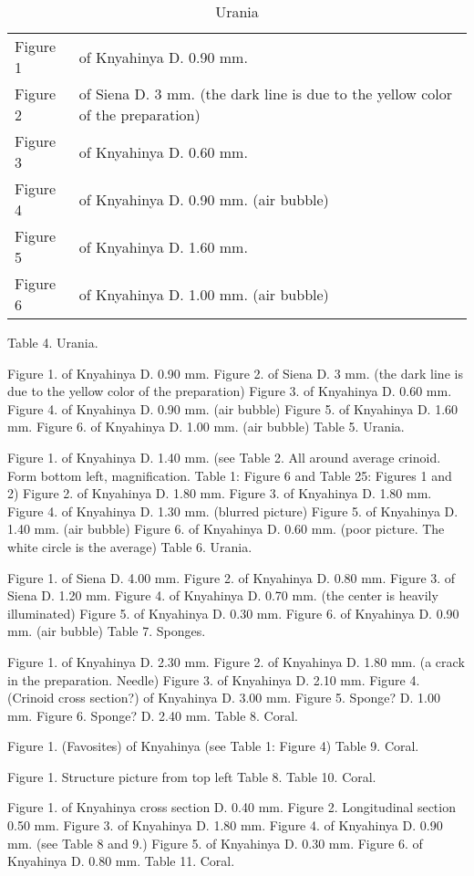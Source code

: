 \documentclass[a4paper, 11pt, oneside]{article}
\begin{document}
\begin{table}[h!]
\caption{Urania}
\centering
\begin{tabular}{ p{1.5cm} p{10cm} }
\hline
 Figure 1 & of Knyahinya D. 0.90 mm. \\
 Figure 2 & of Siena D. 3 mm. (the dark line is due to the yellow color of the preparation) \\
 Figure 3 & of Knyahinya D. 0.60 mm. \\
 Figure 4 & of Knyahinya D. 0.90 mm. (air bubble) \\
 Figure 5 & of Knyahinya D. 1.60 mm. \\
 Figure 6 & of Knyahinya D. 1.00 mm. (air bubble)
\end{tabular}
\label{table:4}
\end{table}
Table 4. Urania.

Figure 1. of Knyahinya D. 0.90 mm.
Figure 2. of Siena D. 3 mm. (the dark line is due to the yellow color of the preparation)
Figure 3. of Knyahinya D. 0.60 mm.
Figure 4. of Knyahinya D. 0.90 mm. (air bubble)
Figure 5. of Knyahinya D. 1.60 mm.
Figure 6. of Knyahinya D. 1.00 mm. (air bubble)
Table 5. Urania.

Figure 1. of Knyahinya D. 1.40 mm. (see Table 2. All around average crinoid. Form bottom left, magnification. Table 1: Figure 6 and Table 25: Figures 1 and 2)
Figure 2. of Knyahinya D. 1.80 mm.
Figure 3. of Knyahinya D. 1.80 mm.
Figure 4. of Knyahinya D. 1.30 mm. (blurred picture)
Figure 5. of Knyahinya D. 1.40 mm. (air bubble)
Figure 6. of Knyahinya D. 0.60 mm. (poor picture. The white circle is the average)
Table 6. Urania.

Figure 1. of Siena D. 4.00 mm.
Figure 2. of Knyahinya D. 0.80 mm.
Figure 3. of Siena D. 1.20 mm.
Figure 4. of Knyahinya D. 0.70 mm. (the center is heavily illuminated)
Figure 5. of Knyahinya D. 0.30 mm.
Figure 6. of Knyahinya D. 0.90 mm. (air bubble)
Table 7. Sponges.

Figure 1. of Knyahinya D. 2.30 mm.
Figure 2. of Knyahinya D. 1.80 mm. (a crack in the preparation. Needle)
Figure 3. of Knyahinya D. 2.10 mm.
Figure 4. (Crinoid cross section?) of Knyahinya D. 3.00 mm.
Figure 5. Sponge? D. 1.00 mm.
Figure 6. Sponge? D. 2.40 mm.
Table 8. Coral.

Figure 1. (Favosites) of Knyahinya (see Table 1: Figure 4)
Table 9. Coral.

Figure 1. Structure picture from top left Table 8.
Table 10. Coral.

Figure 1. of Knyahinya cross section D. 0.40 mm.
Figure 2. Longitudinal section 0.50 mm.
Figure 3. of Knyahinya D. 1.80 mm.
Figure 4. of Knyahinya D. 0.90 mm. (see Table 8 and 9.)
Figure 5. of Knyahinya D. 0.30 mm.
Figure 6. of Knyahinya D. 0.80 mm.
Table 11. Coral.
\end{document}
